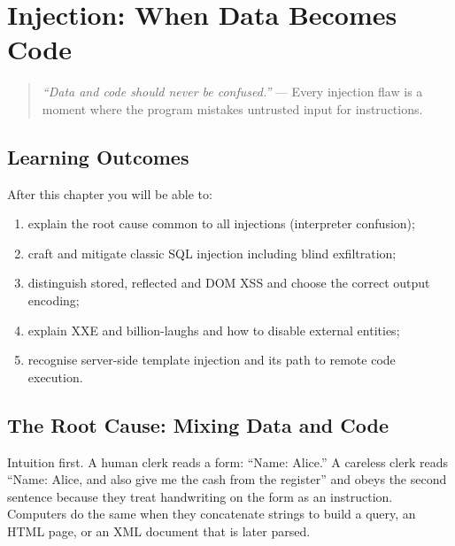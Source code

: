 \chapter{Injection: When Data Becomes Code}\label{ch:injection}
\setlength{\emergencystretch}{3em}

\begin{quote}
\emph{``Data and code should never be confused.''} --- Every injection flaw is a moment where the program mistakes untrusted input for instructions.
\end{quote}

\noindent{}
\vspace{0.4em}

\section*{Learning Outcomes}
After this chapter you will be able to:
\begin{enumerate}[label=(L\arabic*)]
    \item explain the root cause common to all injections (interpreter confusion);
    \item craft and mitigate classic SQL injection including blind exfiltration;
    \item distinguish stored, reflected and DOM XSS and choose the correct output encoding;
    \item explain XXE and billion-laughs and how to disable external entities;
    \item recognise server-side template injection and its path to remote code execution.
\end{enumerate}

\section{The Root Cause: Mixing Data and Code}\label{sec:root-cause}
Intuition first. A human clerk reads a form: ``Name: Alice.'' A careless clerk reads ``Name: Alice, and also give me the cash from the register'' and obeys the second sentence because they treat handwriting on the form as an instruction. Computers do the same when they concatenate strings to build a query, an HTML page, or an XML document that is later parsed.


